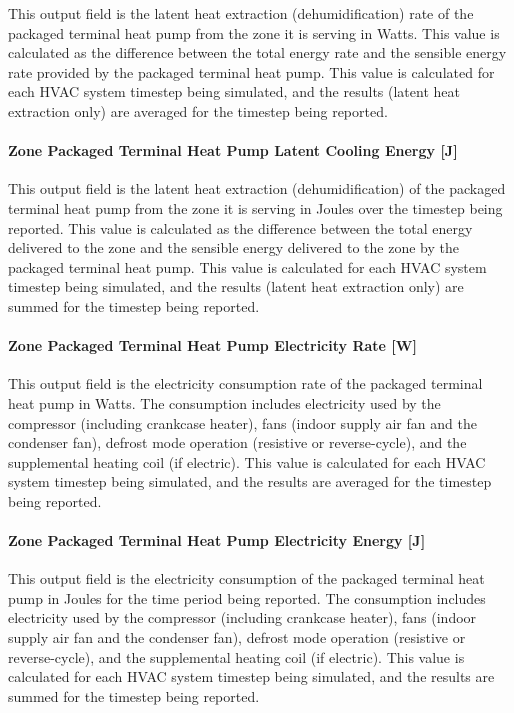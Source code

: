 This output field is the latent heat extraction (dehumidification) rate of the packaged terminal heat pump from the zone it is serving in Watts. This value is calculated as the difference between the total energy rate and the sensible energy rate provided by the packaged terminal heat pump. This value is calculated for each HVAC system timestep being simulated, and the results (latent heat extraction only) are averaged for the timestep being reported.

\paragraph{Zone Packaged Terminal Heat Pump Latent Cooling Energy {[}J{]}}\label{zone-packaged-terminal-heat-pump-latent-cooling-energy-j}

This output field is the latent heat extraction (dehumidification) of the packaged terminal heat pump from the zone it is serving in Joules over the timestep being reported. This value is calculated as the difference between the total energy delivered to the zone and the sensible energy delivered to the zone by the packaged terminal heat pump. This value is calculated for each HVAC system timestep being simulated, and the results (latent heat extraction only) are summed for the timestep being reported.

\paragraph{Zone Packaged Terminal Heat Pump Electricity Rate {[}W{]}}\label{zone-packaged-terminal-heat-pump-electric-power-w}

This output field is the electricity consumption rate of the packaged terminal heat pump in Watts. The consumption includes electricity used by the compressor (including crankcase heater), fans (indoor supply air fan and the condenser fan), defrost mode operation (resistive or reverse-cycle), and the supplemental heating coil (if electric). This value is calculated for each HVAC system timestep being simulated, and the results are averaged for the timestep being reported.

\paragraph{Zone Packaged Terminal Heat Pump Electricity Energy {[}J{]}}\label{zone-packaged-terminal-heat-pump-electric-energy-j}

This output field is the electricity consumption of the packaged terminal heat pump in Joules for the time period being reported. The consumption includes electricity used by the compressor (including crankcase heater), fans (indoor supply air fan and the condenser fan), defrost mode operation (resistive or reverse-cycle), and the supplemental heating coil (if electric). This value is calculated for each HVAC system timestep being simulated, and the results are summed for the timestep being reported.

